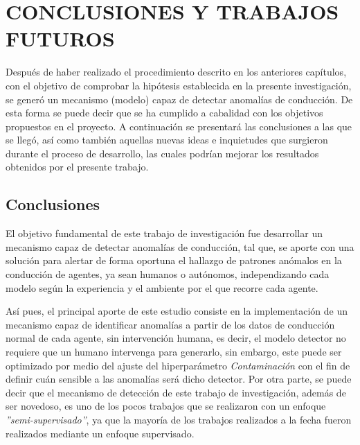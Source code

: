\chapter{\uppercase{Conclusiones y trabajos futuros}}
\label{Capitulo 7}

Despu\'{e}s de haber realizado el procedimiento descrito en los anteriores cap\'{i}tulos, con el objetivo de comprobar la hip\'{o}tesis establecida en la presente investigaci\'{o}n, se gener\'{o} un mecanismo (modelo) capaz de detectar anomal\'{i}as de conducci\'{o}n. De esta forma se puede decir que se ha cumplido a cabalidad con los objetivos propuestos en el proyecto. A continuaci\'{o}n se presentar\'{a} las conclusiones a las que se lleg\'{o}, as\'{i} como tambi\'{e}n aquellas nuevas ideas e inquietudes que surgieron durante el proceso de desarrollo, las cuales podr\'{i}an mejorar los resultados obtenidos por el presente trabajo.

\section{Conclusiones}

El objetivo fundamental de este trabajo de investigaci\'{o}n fue desarrollar un mecanismo capaz de detectar anomal\'{i}as de conducci\'{o}n, tal que, se aporte con una soluci\'{o}n para alertar de forma oportuna el hallazgo de patrones an\'{o}malos en la conducci\'{o}n de agentes, ya sean humanos o aut\'{o}nomos, independizando cada modelo seg\'{u}n la experiencia y el ambiente por el que recorre cada agente.

\vspace{5mm} %

As\'{i} pues, el principal aporte de este estudio consiste en la implementaci\'{o}n de un mecanismo capaz de identificar anomal\'{i}as a partir de los datos de conducci\'{o}n normal de cada agente, sin intervenci\'{o}n humana, es decir, el modelo detector no requiere que un humano intervenga para generarlo, sin embargo, este puede ser optimizado por medio del ajuste del hiperpar\'{a}metro \textit{Contaminaci\'{o}n} con el fin de definir cu\'{a}n sensible a las anomal\'{i}as ser\'{a} dicho detector. Por otra parte, se puede decir que el mecanismo de detecci\'{o}n de este trabajo de investigaci\'{o}n, adem\'{a}s de ser novedoso, es uno de los pocos trabajos que se realizaron con un enfoque \textit{''semi-supervisado''}, ya que la mayor\'{i}a de los trabajos realizados a la fecha fueron realizados mediante un enfoque supervisado.

